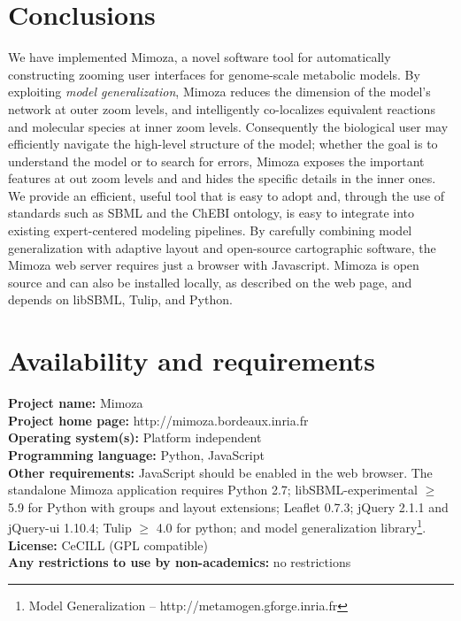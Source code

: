 \documentclass{bmcart}
\begin{document}
\section*{Conclusions}
We have implemented Mimoza, a novel software tool for automatically constructing zooming
user interfaces for genome-scale metabolic models. 
By exploiting \emph{model generalization}, Mimoza reduces
the dimension of the model's network at outer zoom levels, and intelligently co-localizes
equivalent reactions and molecular species at inner zoom levels.
Consequently the biological user may efficiently navigate the high-level structure of the
model; whether the goal is to understand the model or to search for errors, Mimoza exposes
the important features at out zoom levels and and hides the specific details in the inner
ones.
We provide an efficient, useful tool that is easy to adopt and, through the use of
standards such as SBML and the ChEBI ontology, is easy to integrate into existing
expert-centered modeling pipelines.
By carefully combining model generalization with adaptive layout and open-source
cartographic software, the Mimoza web server requires just a browser with Javascript. 
Mimoza is open source and can also be installed locally, as described on the web page,
and depends on libSBML, Tulip, and Python.

\section*{Availability and requirements}
\textbf{Project name:} Mimoza\\
\textbf{Project home page:} http://mimoza.bordeaux.inria.fr\\
\textbf{Operating system(s):} Platform independent\\
\textbf{Programming language:} Python, JavaScript\\
\textbf{Other requirements:} JavaScript should be enabled in the web browser. The
standalone Mimoza application requires Python 2.7; libSBML-experimental $\geq$ 5.9 for
Python with groups and layout extensions; Leaflet 0.7.3; jQuery 2.1.1 and jQuery-ui
1.10.4; Tulip $\geq$ 4.0 for python; and model generalization library\footnote{Model Generalization -- http://metamogen.gforge.inria.fr}.\\
\textbf{License:} CeCILL (GPL compatible)\\
\textbf{Any restrictions to use by non-academics:} no restrictions
\end{document}

